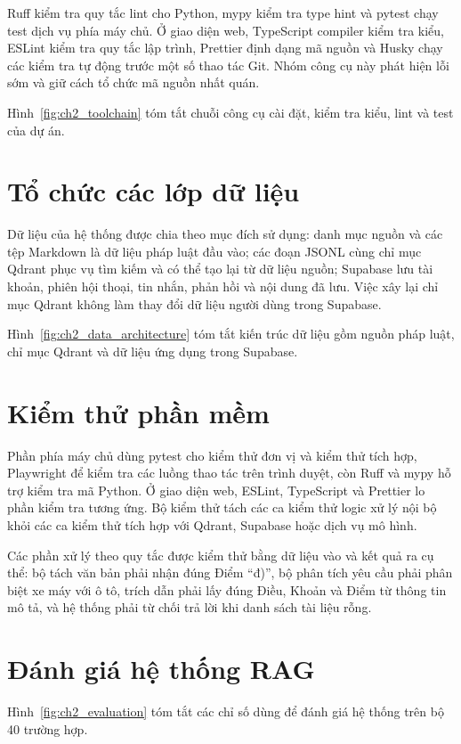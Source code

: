 \documentclass[12pt,a4paper,oneside]{report}
\begin{document}
Ruff kiểm tra quy tắc lint cho Python, mypy kiểm tra type hint và pytest chạy test dịch vụ phía máy chủ. Ở giao diện web, TypeScript compiler kiểm tra kiểu, ESLint kiểm tra quy tắc lập trình, Prettier định dạng mã nguồn và Husky chạy các kiểm tra tự động trước một số thao tác Git. Nhóm công cụ này phát hiện lỗi sớm và giữ cách tổ chức mã nguồn nhất quán.

Hình~\ref{fig:ch2_toolchain} tóm tắt chuỗi công cụ cài đặt, kiểm tra kiểu, lint và test của dự án.

\section{Tổ chức các lớp dữ liệu}
Dữ liệu của hệ thống được chia theo mục đích sử dụng: danh mục nguồn và các tệp Markdown là dữ liệu pháp luật đầu vào; các đoạn JSONL cùng chỉ mục Qdrant phục vụ tìm kiếm và có thể tạo lại từ dữ liệu nguồn; Supabase lưu tài khoản, phiên hội thoại, tin nhắn, phản hồi và nội dung đã lưu. Việc xây lại chỉ mục Qdrant không làm thay đổi dữ liệu người dùng trong Supabase.

Hình~\ref{fig:ch2_data_architecture} tóm tắt kiến trúc dữ liệu gồm nguồn pháp luật, chỉ mục Qdrant và dữ liệu ứng dụng trong Supabase.

\section{Kiểm thử phần mềm}
Phần phía máy chủ dùng pytest cho kiểm thử đơn vị và kiểm thử tích hợp, Playwright để kiểm tra các luồng thao tác trên trình duyệt, còn Ruff và mypy hỗ trợ kiểm tra mã Python. Ở giao diện web, ESLint, TypeScript và Prettier lo phần kiểm tra tương ứng. Bộ kiểm thử tách các ca kiểm thử logic xử lý nội bộ khỏi các ca kiểm thử tích hợp với Qdrant, Supabase hoặc dịch vụ mô hình.

Các phần xử lý theo quy tắc được kiểm thử bằng dữ liệu vào và kết quả ra cụ thể: bộ tách văn bản phải nhận đúng Điểm ``đ)'', bộ phân tích yêu cầu phải phân biệt xe máy với ô tô, trích dẫn phải lấy đúng Điều, Khoản và Điểm từ thông tin mô tả, và hệ thống phải từ chối trả lời khi danh sách tài liệu rỗng.
\section{Đánh giá hệ thống RAG}
Hình~\ref{fig:ch2_evaluation} tóm tắt các chỉ số dùng để đánh giá hệ thống trên bộ 40 trường hợp.
\end{document}
